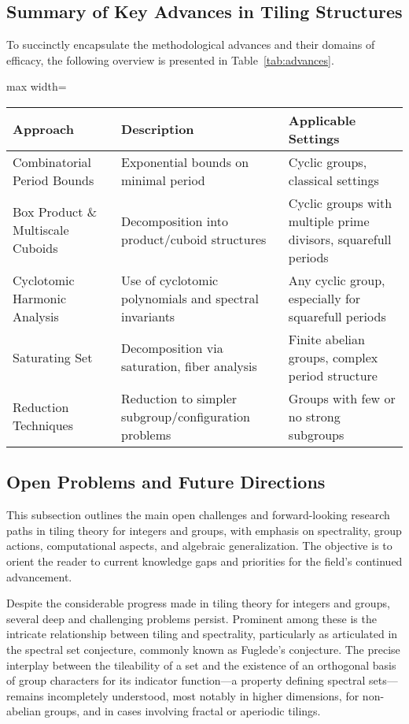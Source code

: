 \documentclass[sigconf]{acmart}
\begin{document}
\subsection{Summary of Key Advances in Tiling Structures}

To succinctly encapsulate the methodological advances and their domains of efficacy, the following overview is presented in Table~\ref{tab:advances}.

\begin{table*}[htbp]
\centering
\caption{Major Approaches in Tiling Theory and Their Domains of Applicability}
\label{tab:advances}
\begin{adjustbox}{max width=\textwidth}
\begin{tabular}{lll}
\toprule
\textbf{Approach} & \textbf{Description} & \textbf{Applicable Settings} \\
\midrule
Combinatorial Period Bounds & Exponential bounds on minimal period & Cyclic groups, classical settings \\
Box Product \& Multiscale Cuboids & Decomposition into product/cuboid structures & Cyclic groups with multiple prime divisors, squarefull periods \\
Cyclotomic Harmonic Analysis & Use of cyclotomic polynomials and spectral invariants & Any cyclic group, especially for squarefull periods \\
Saturating Set & Decomposition via saturation, fiber analysis & Finite abelian groups, complex period structure \\
Reduction Techniques & Reduction to simpler subgroup/configuration problems & Groups with few or no strong subgroups \\
\bottomrule
\end{tabular}
\end{adjustbox}
\end{table*}

\subsection{Open Problems and Future Directions}

This subsection outlines the main open challenges and forward-looking research paths in tiling theory for integers and groups, with emphasis on spectrality, group actions, computational aspects, and algebraic generalization. The objective is to orient the reader to current knowledge gaps and priorities for the field's continued advancement.

Despite the considerable progress made in tiling theory for integers and groups, several deep and challenging problems persist. Prominent among these is the intricate relationship between tiling and spectrality, particularly as articulated in the spectral set conjecture, commonly known as Fuglede’s conjecture. The precise interplay between the tileability of a set and the existence of an orthogonal basis of group characters for its indicator function—a property defining spectral sets—remains incompletely understood, most notably in higher dimensions, for non-abelian groups, and in cases involving fractal or aperiodic tilings.
\end{document}
